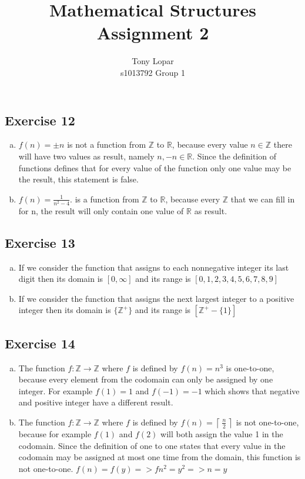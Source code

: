 \documentclass[a4paper]{article}
\title{Mathematical Structures\\Assignment 2}
\author{Tony Lopar \\ s1013792 \quad Group 1}
\newcommand{\exerciseenum}[2]{\subsection*{Exercise #1}{\begin{enumerate}[a)]#2\end{enumerate}}}
\newcommand{\ceil}[1]{\ensuremath{\left\lceil\, #1 \,\right\rceil}}
\newcommand{\ZZ}{\ensuremath{\mathbb{Z}}}
\newcommand{\RR}{\ensuremath{\mathbb{R}}}
\begin{document}
\maketitle


\exerciseenum{12}{%
\item%
$f(n)=\pm n$
is not a function from $\ZZ$ to $\RR$, because every value $n \in \mathbb{Z}$ there will have two values as result, namely $n, -n \in \mathbb{R}$. Since the definition of functions defines that for every value of the function only one value may be the result, this statement is false.

\addtocounter{enumi}{1}
\item%
$f(n)=\frac{1}{n^2-4}$.
is a function from $\ZZ$ to $\RR$,
because every $\mathbb{Z}$ that we can fill in for n, the result will only contain one value of $\mathbb{R}$ as result.
}

\exerciseenum{13}{%
\item%
If we consider the
function that assigns to each nonnegative integer its last digit
then its domain is $[0, \infty]$
and its range is $[0, 1, 2, 3, 4, 5, 6, 7, 8, 9]$
\item%
If we consider the
function that assigns the next largest integer to a positive integer
then its domain is $\{\mathbb{Z^+}\}$
and its range is $[\mathbb{Z^+} - \{1\}]$
}

\exerciseenum{14}{%
\addtocounter{enumi}{2}
\item%
The function $f:\ZZ\to\ZZ$ where $f$ is defined by
$f(n)=n^3$
is one-to-one, because every element from the codomain can only be assigned by one integer. For example $f(1) = 1$ and $f(-1) = - 1$ which shows that negative and positive integer have a different result.

\item%
The function $f:\ZZ\to\ZZ$ where $f$ is defined by
$f(n)=\ceil{\frac{n}{2}}$
is not one-to-one, because for example $f(1)$ and $f(2)$ will both assign the value 1 in the codomain. Since the definition of one to one states that every value in the codomain may be assigned at most one time from the domain, this function is not one-to-one. $f(n) = f(y) => fn^2 = y^2 => n = y$
}
\end{document}
